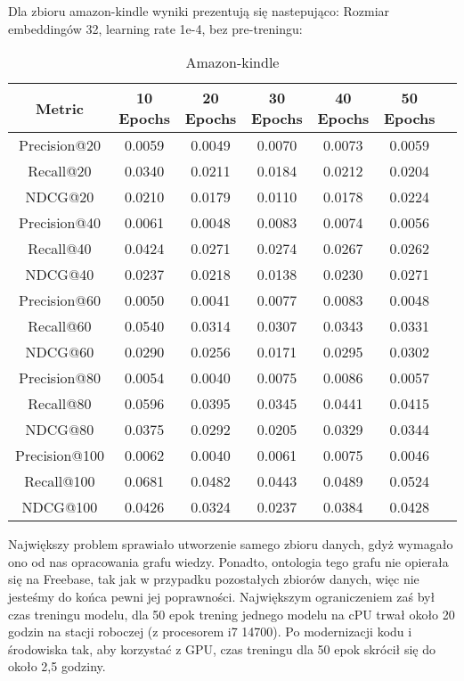 \documentclass[a4paper]{LTJournalArticle}
\begin{document}
	Dla zbioru amazon-kindle wyniki prezentują się nastepująco:
	Rozmiar embeddingów 32, learning rate 1e-4, bez pre-treningu:
	\begin{table}[h]
		\centering
		\caption{Amazon-kindle}
		\label{tab:random_metrics}
		\scriptsize %
		\begin{tabular}{ccccccc}
			\toprule
			Metric & 10 Epochs & 20 Epochs & 30 Epochs & 40 Epochs & 50 Epochs \\
			\midrule
			Precision@20  & 0.0059  & 0.0049  & 0.0070  & 0.0073  & 0.0059  \\
			Recall@20     & 0.0340  & 0.0211  & 0.0184  & 0.0212  & 0.0204  \\
			NDCG@20       & 0.0210  & 0.0179  & 0.0110  & 0.0178  & 0.0224  \\
			Precision@40  & 0.0061  & 0.0048  & 0.0083  & 0.0074  & 0.0056  \\
			Recall@40     & 0.0424  & 0.0271  & 0.0274  & 0.0267  & 0.0262  \\
			NDCG@40       & 0.0237  & 0.0218  & 0.0138  & 0.0230  & 0.0271  \\
			Precision@60  & 0.0050  & 0.0041  & 0.0077  & 0.0083  & 0.0048  \\
			Recall@60     & 0.0540  & 0.0314  & 0.0307  & 0.0343  & 0.0331  \\
			NDCG@60       & 0.0290  & 0.0256  & 0.0171  & 0.0295  & 0.0302  \\
			Precision@80  & 0.0054  & 0.0040  & 0.0075  & 0.0086  & 0.0057  \\
			Recall@80     & 0.0596  & 0.0395  & 0.0345  & 0.0441  & 0.0415  \\
			NDCG@80       & 0.0375  & 0.0292  & 0.0205  & 0.0329  & 0.0344  \\
			Precision@100 & 0.0062  & 0.0040  & 0.0061  & 0.0075  & 0.0046  \\
			Recall@100    & 0.0681  & 0.0482  & 0.0443  & 0.0489  & 0.0524  \\
			NDCG@100      & 0.0426  & 0.0324  & 0.0237  & 0.0384  & 0.0428  \\
			\bottomrule
		\end{tabular}
	\end{table}

	Największy problem sprawiało utworzenie samego zbioru danych, gdyż wymagało ono od nas opracowania grafu wiedzy. Ponadto, ontologia tego grafu nie opierała się na Freebase, tak jak w przypadku pozostałych zbiorów danych, więc nie jesteśmy do końca pewni jej poprawności. Największym ograniczeniem zaś był czas treningu modelu, dla 50 epok trening jednego modelu na cPU trwał około 20 godzin na stacji roboczej (z procesorem i7 14700). Po modernizacji kodu i środowiska tak, aby korzystać z GPU, czas treningu dla 50 epok skrócił się do około 2,5 godziny. 
\end{document}
